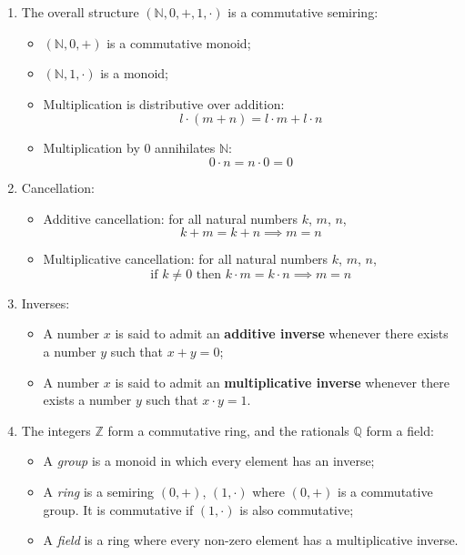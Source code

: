 \documentclass{article}
\begin{document}
\begin{enumerate}
    \item The overall structure $(\mathbb{N},0,+,1,\cdot)$ is a commutative semiring:
        \begin{itemize}[topsep=0pt]
            \item $(\mathbb{N},0,+)$ is a commutative monoid;
            \item $(\mathbb{N},1,\cdot)$ is a monoid;
            \item Multiplication is distributive over addition:
                $$l\cdot(m+n)=l\cdot m+l\cdot n$$
            \item Multiplication by 0 annihilates $\mathbb{N}$:
                $$0\cdot n=n\cdot 0=0$$
        \end{itemize}
    \item Cancellation:
        \begin{itemize}[topsep=0pt]
            \item Additive cancellation: for all natural numbers $k$, $m$, $n$,
                $$k+m=k+n\implies m=n$$
            \item Multiplicative cancellation: for all natural numbers $k$, $m$, $n$,
                $$\text{if }k\neq0\text{ then }k\cdot m=k\cdot n\implies m=n$$
        \end{itemize}
    \item Inverses:
        \begin{itemize}[topsep=0pt]
            \item A number $x$ is said to admit an \textbf{additive inverse} whenever there exists a number $y$ such that $x+y=0$;
            \item A number $x$ is said to admit an \textbf{multiplicative inverse} whenever there exists a number $y$ such that $x\cdot y=1$. 
        \end{itemize}
    \item The integers $\mathbb{Z}$ form a commutative ring, and the rationals $\mathbb{Q}$ form a field:
        \begin{itemize}[topsep=0pt]
            \item A \textit{group} is a monoid in which every element has an inverse;
            \item A \textit{ring} is a semiring $(0,+)$, $(1,\cdot)$ where $(0,+)$ is a commutative group. It is commutative if $(1,\cdot)$ is also commutative;
            \item A \textit{field} is a ring where every non-zero element has a multiplicative inverse.
        \end{itemize}

\end{enumerate}
\end{document}

